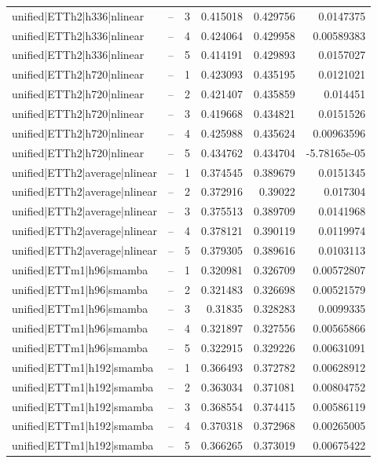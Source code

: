 \begin{longtable}{llrrrr}
unified|ETTh2|h336|nlinear & -- & 3 & 0.415018 & 0.429756 & 0.0147375 \\
unified|ETTh2|h336|nlinear & -- & 4 & 0.424064 & 0.429958 & 0.00589383 \\
unified|ETTh2|h336|nlinear & -- & 5 & 0.414191 & 0.429893 & 0.0157027 \\
unified|ETTh2|h720|nlinear & -- & 1 & 0.423093 & 0.435195 & 0.0121021 \\
unified|ETTh2|h720|nlinear & -- & 2 & 0.421407 & 0.435859 & 0.014451 \\
unified|ETTh2|h720|nlinear & -- & 3 & 0.419668 & 0.434821 & 0.0151526 \\
unified|ETTh2|h720|nlinear & -- & 4 & 0.425988 & 0.435624 & 0.00963596 \\
unified|ETTh2|h720|nlinear & -- & 5 & 0.434762 & 0.434704 & -5.78165e-05 \\
unified|ETTh2|average|nlinear & -- & 1 & 0.374545 & 0.389679 & 0.0151345 \\
unified|ETTh2|average|nlinear & -- & 2 & 0.372916 & 0.39022 & 0.017304 \\
unified|ETTh2|average|nlinear & -- & 3 & 0.375513 & 0.389709 & 0.0141968 \\
unified|ETTh2|average|nlinear & -- & 4 & 0.378121 & 0.390119 & 0.0119974 \\
unified|ETTh2|average|nlinear & -- & 5 & 0.379305 & 0.389616 & 0.0103113 \\
unified|ETTm1|h96|smamba & -- & 1 & 0.320981 & 0.326709 & 0.00572807 \\
unified|ETTm1|h96|smamba & -- & 2 & 0.321483 & 0.326698 & 0.00521579 \\
unified|ETTm1|h96|smamba & -- & 3 & 0.31835 & 0.328283 & 0.0099335 \\
unified|ETTm1|h96|smamba & -- & 4 & 0.321897 & 0.327556 & 0.00565866 \\
unified|ETTm1|h96|smamba & -- & 5 & 0.322915 & 0.329226 & 0.00631091 \\
unified|ETTm1|h192|smamba & -- & 1 & 0.366493 & 0.372782 & 0.00628912 \\
unified|ETTm1|h192|smamba & -- & 2 & 0.363034 & 0.371081 & 0.00804752 \\
unified|ETTm1|h192|smamba & -- & 3 & 0.368554 & 0.374415 & 0.00586119 \\
unified|ETTm1|h192|smamba & -- & 4 & 0.370318 & 0.372968 & 0.00265005 \\
unified|ETTm1|h192|smamba & -- & 5 & 0.366265 & 0.373019 & 0.00675422 \\

\end{longtable}
